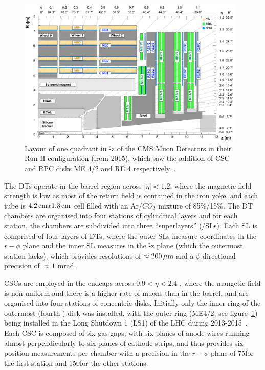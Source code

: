 \begin{figure}[htbp]
\begin{center}
\includegraphics[width=0.97\textwidth]{figs/cms/cms_muon_quadrant_run_ii.pdf}
\caption{Layout of one quadrant in \r-z of the CMS Muon Detectors in their Run II configuration (from 2015), which saw the addition of CSC and RPC disks ME 4/2 and RE 4 respectively~\cite{CMS-DP-2016-046}.}
\label{fig:muonChambers}
\end{center}
\end{figure}

The DTs operate in the barrel region across $|\eta| < 1.2$, where the magnetic field strength is low as most of the return field is contained in the iron yoke,	and each tube is $4.2\,\text{cm} x 1.3\,\text{cm}$ cell filled with an Ar/$CO_{2}$ mixture of 85\%/15\%.
The DT chambers are organised into four stations of cylindrical layers and for each station, the chambers are subdivided into three ``superlayers'' (/SLs).
Each SL is comprised of four layers of DTs, where the outer SLs measure coordinates in the $r-\phi$ plane and the inner SL measures in the \r-z plane (which the outermost station lacks), which provides resolutions of $\approx 200\,\mu\text{m}$ and a $\phi$ directional precision of $\approx 1$ mrad.

CSCs are employed in the endcaps across $0.9 < \eta < 2.4$ , where the mangetic field is non-uniform and there is a higher rate of muons than in the barrel, and are organised into four stations of concentric disks.
Initially only the inner ring of the outermost (fourth ) disk was installed, with the outer ring (ME4/2, see figure~\ref{fig:muonChambers}) being installed in the Long Shutdown 1 (LS1) of the LHC during 2013-2015~\cite{Battilana:2017mrm}.
Each CSC is composed of six gas gaps, with six planes of anode wires running almost perpendicularly to six planes of cathode strips, and thus provides six position measurements per chamber with a precision in the $r-\phi$ plane of 75\mum for the first station and 150\mum for the other stations\cite{CMS:1997iti}.

